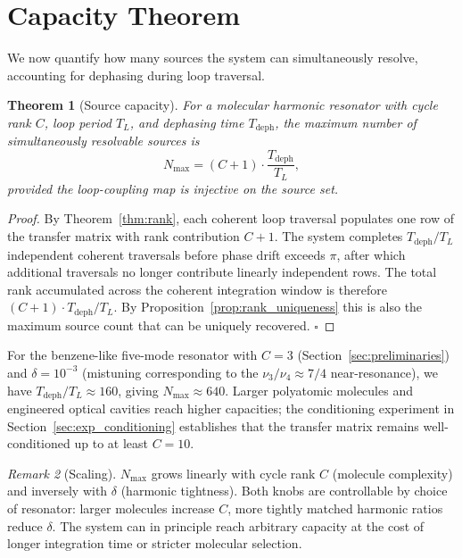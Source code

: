 \documentclass[11pt,twocolumn,a4paper]{article}
\newtheorem{theorem}{Theorem}[section]
\theoremstyle{definition}
\theoremstyle{remark}
\newtheorem{remark}[theorem]{Remark}
\begin{document}
\section{Capacity Theorem}
\label{sec:capacity}

We now quantify how many sources the system can simultaneously resolve, accounting for dephasing during loop traversal.

\begin{theorem}[Source capacity]
\label{thm:capacity}
For a molecular harmonic resonator with cycle rank $C$, loop period $T_L$, and dephasing time $T_{\mathrm{deph}}$, the maximum number of simultaneously resolvable sources is
\begin{equation}
\label{eq:capacity}
N_{\max} = (C + 1) \cdot \frac{T_{\mathrm{deph}}}{T_L},
\end{equation}
provided the loop-coupling map is injective on the source set.
\end{theorem}

\begin{proof}
By Theorem~\ref{thm:rank}, each coherent loop traversal populates one row of the transfer matrix with rank contribution $C + 1$. The system completes $T_{\mathrm{deph}}/T_L$ independent coherent traversals before phase drift exceeds $\pi$, after which additional traversals no longer contribute linearly independent rows. The total rank accumulated across the coherent integration window is therefore $(C+1) \cdot T_{\mathrm{deph}}/T_L$. By Proposition~\ref{prop:rank_uniqueness} this is also the maximum source count that can be uniquely recovered. $\square$
\end{proof}

\begin{example}
For the benzene-like five-mode resonator with $C = 3$ (Section~\ref{sec:preliminaries}) and $\delta = 10^{-3}$ (mistuning corresponding to the $\nu_3/\nu_4 \approx 7/4$ near-resonance), we have $T_{\mathrm{deph}}/T_L \approx 160$, giving $N_{\max} \approx 640$. Larger polyatomic molecules and engineered optical cavities reach higher capacities; the conditioning experiment in Section~\ref{sec:exp_conditioning} establishes that the transfer matrix remains well-conditioned up to at least $C = 10$.
\end{example}

\begin{remark}[Scaling]
$N_{\max}$ grows linearly with cycle rank $C$ (molecule complexity) and inversely with $\delta$ (harmonic tightness). Both knobs are controllable by choice of resonator: larger molecules increase $C$, more tightly matched harmonic ratios reduce $\delta$. The system can in principle reach arbitrary capacity at the cost of longer integration time or stricter molecular selection.
\end{remark}
\end{document}
